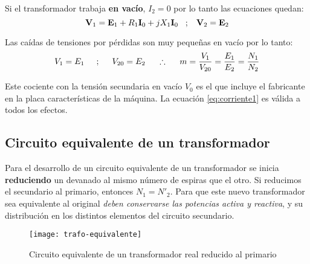 Si el transformador trabaja \textbf{en vacío}, $I_{2}=0$ por lo tanto las ecuaciones quedan:
\begin{equation*}
	\fasor{v}_{1} = \fasor{e}_{1} + R_{1} \fasor{i}_{0} + j X_{1} \fasor{i}_{0}  \hspace{.3cm};\hspace{.3cm}	\fasor{v}_{2} = \fasor{e}_{2}
\end{equation*}

Las caídas de tensiones por pérdidas son muy pequeñas en vacío por lo tanto:
\begin{equation}
	V_{1}=E_{1} \hspace{5mm} ; \hspace{5mm} V_{20}=E_{2} \hspace{5mm} \therefore \hspace{5mm} m=\dfrac{V_{1}}{V_{20}}=\dfrac{E_{1}}{E_{2}}=\dfrac{N_{1}}{N_{2}}
\end{equation}


Este cociente con la tensión secundaria en vacío $V_0$ es el que incluye el fabricante en la placa características de la máquina. La ecuación \ref{eq:corriente1} es válida a todos los efectos.

\subsection{Circuito equivalente de un transformador}
Para el desarrollo de un circuito equivalente de un transformador se inicia \textbf{reduciendo} un devanado al mismo número de espiras que el otro. Si reducimos el secundario al primario, entonces $N_{1}=N'_{2}$. Para que este nuevo transformador sea equivalente al original \textsl{deben conservarse las potencias activa y reactiva}, y su distribución en los distintos elementos del circuito secundario. 
\begin{figure}[H]
	\centering
	\texttt{[image: trafo-equivalente]}
	\caption{Circuito equivalente de un transformador real reducido al primario}
\end{figure} 

